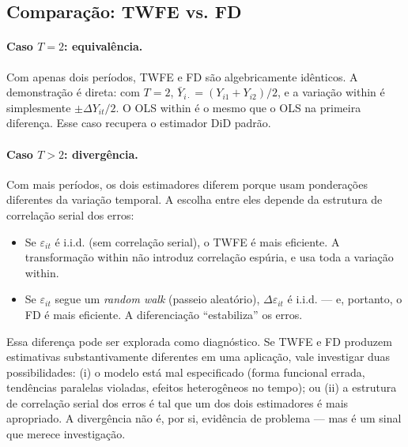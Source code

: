 \subsection*{Comparação: TWFE vs. FD}

\paragraph{Caso $T = 2$: equivalência.} Com apenas dois períodos, TWFE e FD são algebricamente idênticos. A demonstração é direta: com $T = 2$, $\bar{Y}_{i\cdot} = (Y_{i1} + Y_{i2})/2$, e a variação within é simplesmente $\pm \Delta Y_{it}/2$. O OLS within é o mesmo que o OLS na primeira diferença. Esse caso recupera o estimador DiD padrão.

\paragraph{Caso $T > 2$: divergência.} Com mais períodos, os dois estimadores diferem porque usam ponderações diferentes da variação temporal. A escolha entre eles depende da estrutura de correlação serial dos erros:
\begin{itemize}
  \item Se $\varepsilon_{it}$ é i.i.d. (sem correlação serial), o TWFE é mais eficiente. A transformação within não introduz correlação espúria, e usa toda a variação within.
  \item Se $\varepsilon_{it}$ segue um \textit{random walk} (passeio aleatório), $\Delta \varepsilon_{it}$ é i.i.d. --- e, portanto, o FD é mais eficiente. A diferenciação ``estabiliza'' os erros.
\end{itemize}

Essa diferença pode ser explorada como diagnóstico. Se TWFE e FD produzem estimativas substantivamente diferentes em uma aplicação, vale investigar duas possibilidades: (i) o modelo está mal especificado (forma funcional errada, tendências paralelas violadas, efeitos heterogêneos no tempo); ou (ii) a estrutura de correlação serial dos erros é tal que um dos dois estimadores é mais apropriado. A divergência não é, por si, evidência de problema --- mas é um sinal que merece investigação.

